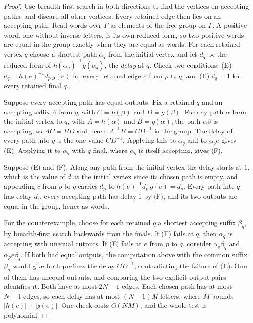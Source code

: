 \documentclass[11pt,a4paper]{article}
\theoremstyle{definition}
\theoremstyle{plain}
\begin{document}
\begin{proof}
Use breadth-first search in both directions to find the vertices on accepting paths, and discard all other vertices.
Every retained edge then lies on an accepting path. Read words over $\Gamma$ as elements of the free group on $\Gamma$.
A positive word, one without inverse letters, is its own reduced form, so two positive words are equal in the group
exactly when they are equal as words. For each retained vertex $q$ choose a shortest path $\alpha_q$ from the initial
vertex and let $d_q$ be the reduced form of $h(\alpha_q)^{-1} g(\alpha_q)$, the \emph{delay} at $q$. Check two
conditions: (E) $d_q = h(e)^{-1} d_p\, g(e)$ for every retained edge $e$ from $p$ to $q$, and (F) $d_q = 1$ for every
retained final $q$.

Suppose every accepting path has equal outputs. Fix a retained $q$ and an accepting suffix $\beta$ from $q$, with
$C = h(\beta)$ and $D = g(\beta)$. For any path $\alpha$ from the initial vertex to $q$, with $A = h(\alpha)$ and
$B = g(\alpha)$, the path $\alpha\beta$ is accepting, so $AC = BD$ and hence $A^{-1}B = CD^{-1}$ in the group. The delay
of every path into $q$ is the one value $CD^{-1}$. Applying this to $\alpha_q$ and to $\alpha_p e$ gives (E). Applying
it to $\alpha_q$ with $q$ final, where $\alpha_q$ is itself accepting, gives (F).

Suppose (E) and (F). Along any path from the initial vertex the delay starts at $1$, which is the value of $d$ at the
initial vertex since its chosen path is empty, and appending $e$ from $p$ to $q$ carries $d_p$ to
$h(e)^{-1} d_p\, g(e) = d_q$. Every path into $q$ has delay $d_q$, every accepting path has delay $1$ by (F), and its
two outputs are equal in the group, hence as words.

For the counterexample, choose for each retained $q$ a shortest accepting suffix $\beta_q$, by breadth-first search
backwards from the finals. If (F) fails at $q$, then $\alpha_q$ is accepting with unequal outputs. If (E) fails at $e$
from $p$ to $q$, consider $\alpha_q \beta_q$ and $\alpha_p e \beta_q$. If both had equal outputs, the computation above
with the common suffix $\beta_q$ would give both prefixes the delay $CD^{-1}$, contradicting the failure of (E). One of
them has unequal outputs, and comparing the two explicit output pairs identifies it. Both have at most $2N - 1$ edges.
Each chosen path has at most $N - 1$ edges, so each delay has at most $(N - 1)M$ letters, where $M$ bounds
$|h(e)| + |g(e)|$. One check costs $O(NM)$, and the whole test is polynomial.
\end{proof}
\end{document}
